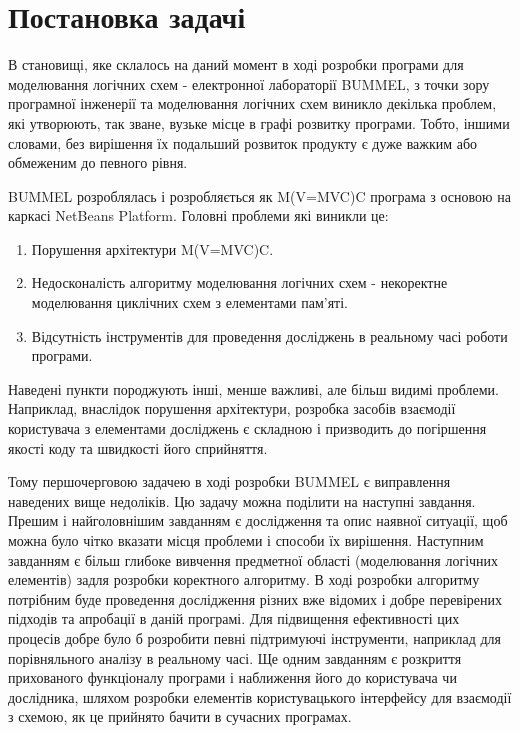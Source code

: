 \documentclass[12pt,a4paper]{article}
\begin{document}
\clearpage

\section{Постановка задачі}

В становищі, яке склалось на даний момент в ході розробки програми для моделювання логічних схем - електронної лабораторії BUMMEL, з точки зору програмної інженерії та моделювання логічних схем виникло декілька проблем, які утворюють, так зване, вузьке місце в графі розвитку програми. Тобто, іншими словами, без вирішення їх подальший розвиток продукту є дуже важким або обмеженим до певного рівня.

BUMMEL розроблялась і розробляється як M(V=MVC)C програма з основою на каркасі NetBeans Platform. Головні проблеми які виникли це:
\begin{enumerate}
  \item Порушення архітектури M(V=MVC)C.
  \item Недосконалість алгоритму моделювання логічних схем - некоректне моделювання циклічних схем з елементами пам’яті.
  \item Відсутність інструментів для проведення досліджень в реальному часі роботи програми.
\end{enumerate}

Наведені пункти породжують інші, менше важливі, але більш видимі проблеми. Наприклад, внаслідок порушення архітектури, розробка засобів взаємодії користувача з елементами досліджень є складною і призводить до погіршення якості коду та швидкості його сприйняття.

Тому першочерговою задачею в ході розробки BUMMEL є виправлення наведених вище недоліків. Цю задачу можна поділити на наступні завдання. Прешим і найголовнішим завданням є дослідження та опис наявної ситуації, щоб можна було чітко вказати місця проблеми і способи їх вирішення. Наступним завданням є більш глибоке вивчення предметної області (моделювання логічних елементів) задля розробки коректного алгоритму. В ході розробки алгоритму потрібним буде проведення дослідження різних вже відомих і добре перевірених підходів та апробації в даній програмі. Для підвищення ефективності цих процесів добре було б розробити певні підтримуючі інструменти, наприклад для порівняльного аналізу в реальному часі. Ще одним завданням є розкриття прихованого функціоналу програми і наближення його до користувача чи дослідника, шляхом розробки елементів користувацького інтерфейсу для взаємодії з схемою, як це прийнято бачити в сучасних програмах.
\end{document}
